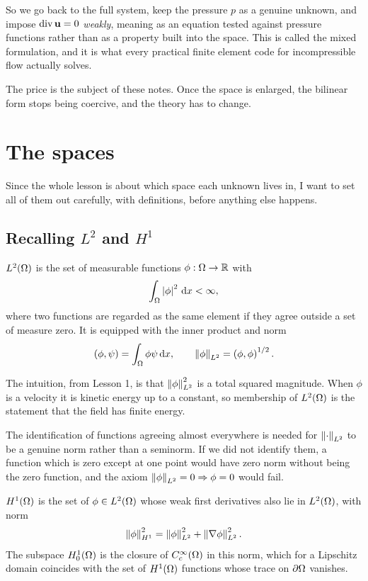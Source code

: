 \documentclass[11pt,a4paper]{article}
\begin{document}
So we go back to the full system, keep the pressure $p$ as a genuine unknown,
and impose $\operatorname{div} \mathbf{u} = 0$ \emph{weakly}, meaning as an equation tested against
pressure functions rather than as a property built into the space. This is
called the mixed formulation, and it is what every practical finite element code
for incompressible flow actually solves.

The price is the subject of these notes. Once the space is enlarged, the
bilinear form stops being coercive, and the theory has to change.

\section{The spaces}

Since the whole lesson is about which space each unknown lives in, I want to set
all of them out carefully, with definitions, before anything else happens.

\subsection{Recalling $L^{2}$ and $H^{1}$}

\begin{definition}
$L^{2}(\Omega)$ is the set of measurable functions $\phi : \Omega \to \mathbb{R}$ with
\[
  \int_\Omega \left\lvert \phi \right\rvert^{2} \,\mathrm{d}x < \infty ,
\]
where two functions are regarded as the same element if they agree outside a set
of measure zero. It is equipped with the inner product and norm
\[
  \left( \phi , \psi \right) = \int_\Omega \phi \psi \,\mathrm{d}x ,
  \qquad
  \left\lVert \phi \right\rVert_{L^{2}} = \left( \phi , \phi \right)^{1/2} .
\]
\end{definition}

The intuition, from Lesson 1, is that $\left\lVert \phi \right\rVert_{L^{2}}^{2}$ is a total squared
magnitude. When $\phi$ is a velocity it is kinetic energy up to a constant, so
membership of $L^{2}(\Omega)$ is the statement that the field has finite energy.

The identification of functions agreeing almost everywhere is needed for
$\left\lVert \cdot \right\rVert_{L^{2}}$ to be a genuine norm rather than a seminorm. If we did not
identify them, a function which is zero except at one point would have zero norm
without being the zero function, and the axiom
$\left\lVert \phi \right\rVert_{L^{2}} = 0 \Rightarrow \phi = 0$ would fail.

\begin{definition}
$H^{1}(\Omega)$ is the set of $\phi \in L^{2}(\Omega)$ whose weak first derivatives also lie in
$L^{2}(\Omega)$, with norm
\[
  \left\lVert \phi \right\rVert_{H^{1}}^{2} = \left\lVert \phi \right\rVert_{L^{2}}^{2} + \left\lVert \nabla \phi \right\rVert_{L^{2}}^{2} .
\]
The subspace $H^{1}_{0}(\Omega)$ is the closure of $C_{c}^{\infty}(\Omega)$ in this norm, which for a
Lipschitz domain coincides with the set of $H^{1}(\Omega)$ functions whose trace on
$\partial\Omega$ vanishes.
\end{definition}
\end{document}
